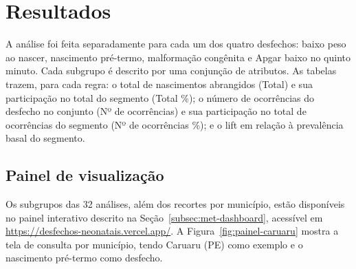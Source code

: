 
\section{Resultados}\label{sec:resultados}

A análise foi feita separadamente para cada um dos quatro desfechos: baixo peso ao nascer, nascimento pré-termo, malformação congênita e Apgar baixo no quinto minuto. 
Cada subgrupo é descrito por uma conjunção de atributos. As tabelas trazem, para cada regra: o total de nascimentos abrangidos (Total) e sua participação no total do segmento (Total \%); o número de ocorrências do desfecho no conjunto (Nº de ocorrências) e sua participação no total de ocorrências do segmento (Nº de ocorrências \%); e o lift em relação à prevalência basal do segmento.








\subsection{Painel de visualização}

Os subgrupos das 32 análises, além dos recortes por município, estão disponíveis no painel interativo descrito na Seção~\ref{subsec:met-dashboard}, acessível em \url{https://desfechos-neonatais.vercel.app/}. A Figura~\ref{fig:painel-caruaru} mostra a tela de consulta por município, tendo Caruaru (PE) como exemplo e o nascimento pré-termo como desfecho.

